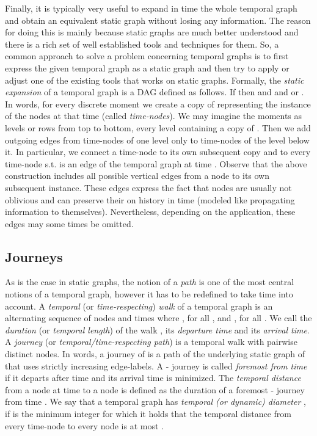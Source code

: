 \documentclass[oribibl, 11pt]{llncs}
\begin{document}
Finally, it is typically very useful to expand in time the whole temporal graph and obtain an equivalent static graph without losing any information. The reason for doing this is mainly because static graphs are much better understood and there is a rich set of well established tools and techniques for them. So, a common approach to solve a problem concerning temporal graphs is to first express the given temporal graph as a static graph and then try to apply or adjust one of the existing tools that works on static graphs. Formally, the \emph{static expansion} of a temporal graph  is a DAG  defined as follows. If  then  and  and  or . In words, for every discrete moment we create a copy of  representing the instance of the nodes at that time (called \emph{time-nodes}). We may imagine the moments as levels or rows from top to bottom, every level containing a copy of . Then we add outgoing edges from time-nodes of one level only to time-nodes of the level below it. In particular, we connect a time-node  to its own subsequent copy  and to every time-node  s.t.  is an edge of the temporal graph at time . Observe that the above construction includes all possible vertical edges from a node to its own subsequent instance. These edges express the fact that nodes are usually not oblivious and can preserve their on history in time (modeled like propagating information to themselves). Nevertheless, depending on the application, these edges may some times be omitted. 

\subsection{Journeys}
\label{subsec:journeys}

As is the case in static graphs, the notion of a \emph{path} is one of the most central notions of a temporal graph, however it has to be redefined to take time into account. A \emph{temporal} (or \emph{time-respecting}) \emph{walk}  of a temporal graph  is an alternating sequence of nodes and times  where , for all , and , for all . We call  the \emph{duration} (or \emph{temporal length}) of the walk ,  its \emph{departure time} and  its \emph{arrival time}. A \emph{journey} (or \emph{temporal/time-respecting path})  is a temporal walk with pairwise distinct nodes. In words, a journey of  is a path of the underlying static graph of  that uses strictly increasing edge-labels. A - journey  is called \emph{foremost from time } if it departs after time  and its arrival time is minimized. The \emph{temporal distance} from a node  at time  to a node  is defined as the duration of a foremost - journey from time . We say that a temporal graph  has \emph{temporal (or dynamic) diameter} , if  is the minimum integer for which it holds that the temporal distance from every time-node  to every node  is at most .
\end{document}
